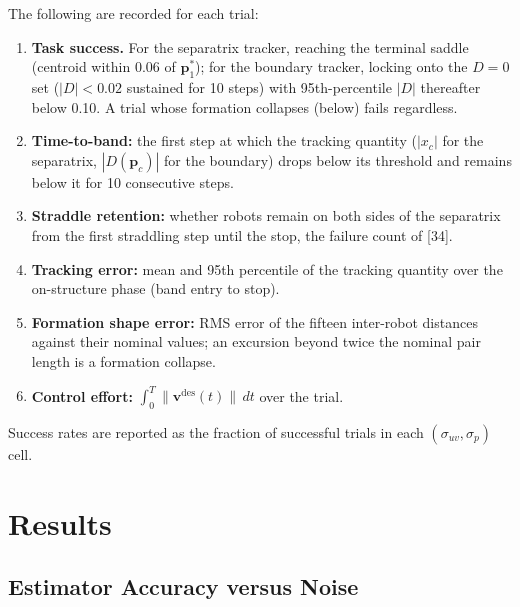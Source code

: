 \documentclass[12pt, letterpaper, oneside]{report}
\begin{document}
The following are recorded for each trial:
\begin{enumerate}
    \item \textbf{Task success.} For the separatrix tracker, reaching
          the terminal saddle (centroid within 0.06 of
          $\mathbf{p}^*_1$); for the boundary tracker, locking onto the
          $D = 0$ set ($|D| < 0.02$ sustained for 10 steps) with
          95th-percentile $|D|$ thereafter below 0.10. A trial whose
          formation collapses (below) fails regardless.
    \item \textbf{Time-to-band:} the first step at which the tracking
          quantity ($|x_c|$ for the separatrix, $|D(\mathbf{p}_c)|$ for
          the boundary) drops below its threshold and remains below it
          for 10 consecutive steps.
    \item \textbf{Straddle retention:} whether robots remain on both
          sides of the separatrix from the first straddling step until
          the stop, the failure count of [34].
    \item \textbf{Tracking error:} mean and 95th percentile of the
          tracking quantity over the on-structure phase (band entry to
          stop).
    \item \textbf{Formation shape error:} RMS error of the fifteen
          inter-robot distances against their nominal values; an
          excursion beyond twice the nominal pair length is a formation
          collapse.
    \item \textbf{Control effort:} $\int_0^T \|\mathbf{v}^{\text{des}}(t)\|
          \,dt$ over the trial.
\end{enumerate}

Success rates are reported as the fraction of successful trials in each
$(\sigma_{uv}, \sigma_p)$ cell.

\section{Results}
\label{sec:results}

\subsection{Estimator Accuracy versus Noise}
\end{document}
